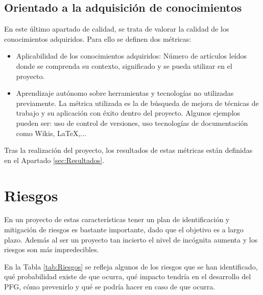 \subsection{Orientado a la adquisición de conocimientos}

En este último apartado de calidad, se trata de valorar la calidad de los conocimientos adquiridos. Para ello se definen dos métricas:

\begin{itemize}
\item{Aplicabilidad de los conocimientos adquiridos: Número de artículos leídos donde se comprenda su contexto, significado y se pueda utilizar en el proyecto.}
\item{Aprendizaje autónomo sobre herramientas y tecnologías no utilizadas previamente. La métrica utilizada es la de búsqueda de mejora de técnicas de trabajo y su aplicación con éxito dentro del proyecto. Algunos ejemplos pueden ser: uso de control de versiones, uso tecnologías de documentación como Wikis, \LaTeX{},...}
\end{itemize}

Tras la realización del proyecto, los resultados de estas métricas están definidas en el Apartado \ref{sec:Resultados}.


\section{Riesgos}
\label{sec:Riesgos}

En un proyecto de estas características tener un plan de identificación y mitigación de riesgos es bastante importante, dado que el objetivo es a largo plazo. Además al ser un proyecto tan incierto el nivel de incógnita aumenta y los riesgos son más impredecibles.

En la Tabla \ref{tab:Riesgos} se refleja algunos de los riesgos que se han identificado, qué probabilidad existe de que ocurra, qué impacto tendría en el desarrollo del PFG, cómo prevenirlo y qué se podría hacer en caso de que ocurra.

